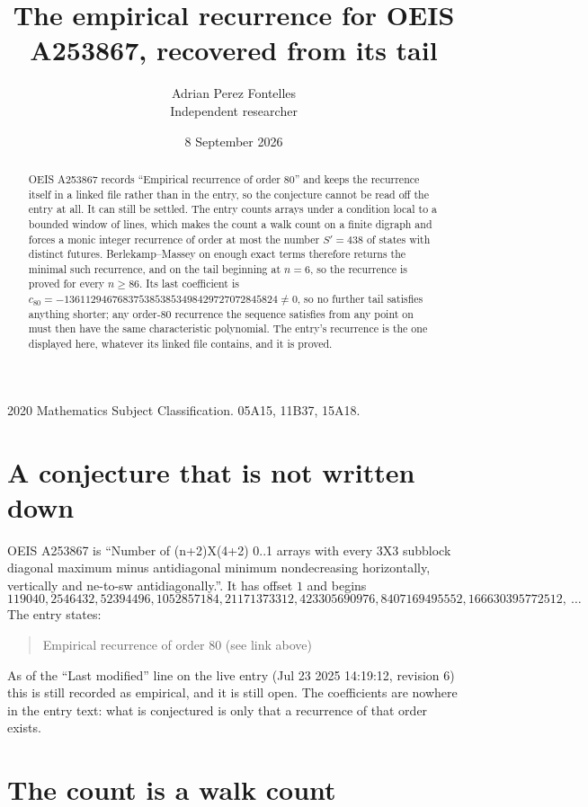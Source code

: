 \documentclass[11pt,a4paper]{article}
\title{The empirical recurrence for OEIS A253867, recovered from its tail}
\author{Adrian Perez Fontelles\\ \small Independent researcher}
\date{8 September 2026}
\theoremstyle{plain}
\theoremstyle{definition}
\begin{document}
\maketitle

\begin{abstract}
OEIS A253867 records ``Empirical recurrence of order $80$'' and keeps the recurrence itself in
a linked file rather than in the entry, so the conjecture cannot be read off the entry at all.
It can still be settled. The entry counts arrays under a condition local to a bounded window of
lines, which makes the count a walk count on a finite digraph and forces a monic integer
recurrence of order at most the number $S'=438$ of states with distinct futures. Berlekamp--Massey on
enough exact terms therefore returns the minimal such recurrence, and on the tail beginning at $n=6$, so the recurrence is proved for every $n\ge86$.
Its last coefficient is $c_{80}=-1361129467683753853853498429727072845824\neq0$, so no further tail satisfies anything
shorter; any order-$80$ recurrence the sequence satisfies from any point on must then have
the same characteristic polynomial. The entry's recurrence is the one displayed here, whatever
its linked file contains, and it is proved.
\end{abstract}

\noindent\small 2020 Mathematics Subject Classification. 05A15, 11B37, 15A18.\normalsize

\section{A conjecture that is not written down}

OEIS A253867 is ``Number of (n+2)X(4+2) 0..1 arrays with every 3X3 subblock diagonal maximum minus antidiagonal minimum nondecreasing horizontally, vertically and ne-to-sw antidiagonally.''. It has offset $1$ and begins
\[
119040, 2546432, 52394496, 1052857184, 21171373312, 423305690976, 8407169495552, 166630395772512,\ \dots
\]
The entry states:
\begin{quote}
Empirical recurrence of order 80 (see link above)
\end{quote}
As of the ``Last modified'' line on the live entry (Jul 23 2025 14:19:12, revision 6)
this is still recorded as empirical, and it is still open. The coefficients are nowhere in the
entry text: what is conjectured is only that a recurrence of that order exists.

\section{The count is a walk count}
\end{document}
